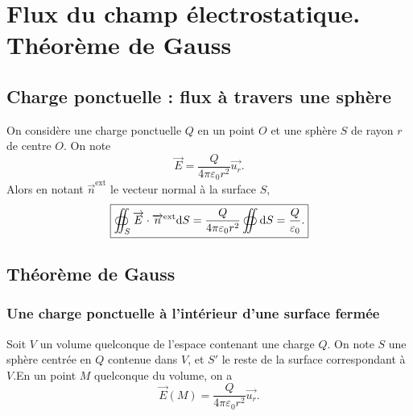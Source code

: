 \section[Flux du champ électrostatique]{Flux du champ électrostatique.\\Théorème de Gauss}

    \subsection{Charge ponctuelle : flux à travers une sphère}

        On considère une charge ponctuelle $Q$ en un point $O$ et une sphère $S$ de rayon $r$ de centre $O$. On note
        \begin{equation}
            \vec{E}=\frac{Q}{4\pi\varepsilon_{0}r^{2}}\vec{u_r}.
        \end{equation}
        Alors en notant $\vec{n}^{\text{ext}}$ le vecteur normal à la surface $S$,
        \begin{equation}
            \boxed{
                \oiint_{S}\protect\overrightarrow{{E}}\cdot\protect\overrightarrow{{n}}^{\text{ext}}\mathrm{d} S=\frac{Q}{4\pi\varepsilon_{0}r^{2}}\oiint\mathrm{d} S=\frac{Q}{\varepsilon_{0}}.
            }
        \end{equation}

    \subsection{Théorème de Gauss}
        \subsubsection{Une charge ponctuelle à l'intérieur d'une surface fermée}

            Soit $V$ un volume quelconque de l'espace contenant une charge $Q$. On note $S$ une sphère centrée en $Q$ contenue dans $V$, et $S'$ le reste de la surface correspondant à $V$.En un point $M$ quelconque du volume, on a
            \begin{equation}
                \vec{E}(M)=\frac{Q}{4\pi\varepsilon_{0}r^{2}}\vec{u_r}.
            \end{equation}


